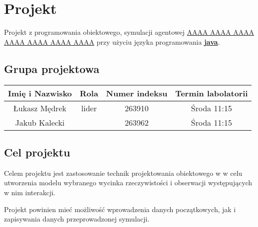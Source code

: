 \documentclass{article}
\begin{document}
\section{Projekt}
Projekt z programowania obiektowego, symulacji agentowej
\uline{AAAA AAAA AAAA AAAA AAAA AAAA AAAA}
przy użyciu języka programowania
\underline{\textbf{java}}.

\subsection{Grupa projektowa}
\begin{center}
	\begin{tabular}{cccc}
		Imię i Nazwisko & Rola & Numer indeksu & Termin labolatorii \\
		\hline Łukasz Mędrek & lider & 263910 & Środa 11:15 \\
		Jakub Kalecki & & 263962 & Środa 11:15 \\
	\end{tabular}
\end{center}

\subsection{Cel projektu}
Celem projektu jest zastosowanie technik projektowania obiektowego w  
w celu utworzenia modelu wybranego wycinka rzeczywistości i obserwacji
występujących w nim interakcji.

Projekt powinien mieć możliwość wprowadzenia danych początkowych, jak 
i zapisywania danych przeprowadzonej symulacji.
\end{document}
